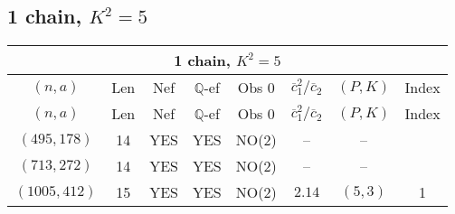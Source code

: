 \subsection{1 chain, $K^2 = 5$}
\begin{longtable}{|c|c|c|c|c|c|c|c|}
\hline
\multicolumn{8}{|c|}{1 chain, $K^2 = 5$}\\
\hline
$(n,a)$ & Len & Nef & $\mathbb Q$-ef & Obs 0 & $\overline c_1^2 / \overline c_2$ & $(P,K)$ & Index\\
\hline
\endfirsthead

\hline
$(n,a)$ & Len & Nef & $\mathbb Q$-ef & Obs 0 & $\overline c_1^2 / \overline c_2$ & $(P,K)$ & Index\\
\hline
\endhead
\hline
\endfoot

$(495,178)$ & 14 & YES & YES & NO(2) & -- & -- & \\
$(713,272)$ & 14 & YES & YES & NO(2) & -- & -- & \\
$(1005,412)$ & 15 & YES & YES & NO(2) & $2.14$ & $(5,3)$ & 1
\end{longtable}
